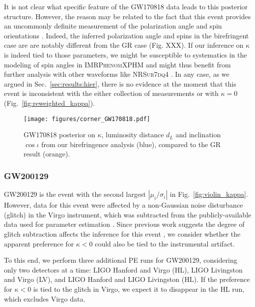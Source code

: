 \documentclass[aps,prd,twocolumn,superscriptaddress,preprintnumbers,floatfix,nofootinbib]{revtex4-2}
\begin{document}
It is not clear what specific feature of the GW170818 data leads to this posterior structure.
However, the reason may be related to the fact that this event provides an uncommonly definite measurement of the polarization angle and spin orientations \cite{Varma:2021csh}.
Indeed, the inferred polarization angle and spins in the birefringent case are are notably different from the \ac{GR} case (Fig. XXX).
If our inference on $\kappa$ is indeed tied to those parameters, we might be susceptible to systematics in the modeling of spin angles in \textsc{IMRPhenomXPHM} and might thus benefit from further analysis with other waveforms like \textsc{NRSur7dq4} \cite{Varma:2018mmi}.
In any case, as we argued in Sec.~\ref{sec:results:hier}, there is no evidence at the moment that this event is inconsistent with the either collection of measurements or with $\kappa = 0$ (Fig.~\ref{fig:reweighted_kappa}).

\begin{figure}
    \texttt{[image: figures/corner\_GW170818.pdf]}
    \caption{GW170818 posterior on $\kappa$, luminosity distance $d_L$ and inclination $\cos\iota$ from our birefringence analysis (blue), compared to the GR result (orange).}
    \label{fig:corner_GW170818}
\end{figure}

\subsubsection{GW200129}
\label{sec:GW200129}

GW200129 is the event with the second largest $|\mu_i/\sigma_i|$ in Fig.~\ref{fig:violin_kappa}.
However, data for this event were affected by a non-Gaussian noise disturbance (glitch) in the Virgo instrument, which was subtracted from the publicly-available data used for parameter estimation \cite{Davis:2022ird}.
Since previous work suggests the degree of glitch subtraction affects the inference for this event \citep{GW200129_glitch}, we consider whether the apparent preference for $\kappa < 0$ could also be tied to the instrumental artifact.

To this end, we perform three additional \ac{PE} runs for GW200129, considering only two detectors at a time: LIGO Hanford and Virgo (HL), LIGO Livingston and Virgo (LV), and LIGO Hanford and LIGO Livingston (HL).
If the preference for $\kappa < 0$ is tied to the glitch in Virgo, we expect it to disappear in the HL run, which excludes Virgo data.
\end{document}
